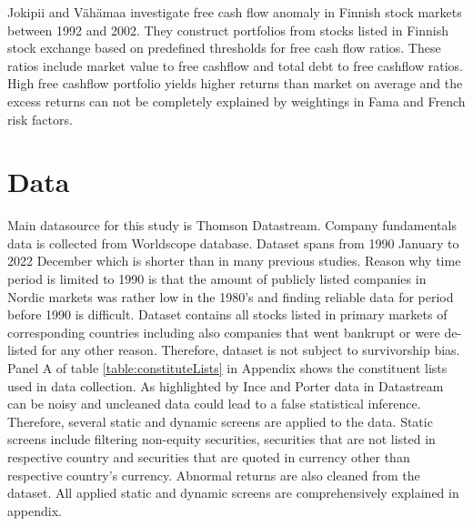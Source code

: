 \documentclass{article}
\begin{document}
Jokipii and Vähämaa \citeyear{jokipii2006free} investigate free cash flow anomaly in Finnish stock markets between 1992 and 2002. They construct portfolios from stocks listed in Finnish stock exchange based on predefined thresholds for free cash flow ratios. These ratios include market value to free cashflow and total debt to free cashflow ratios. High free cashflow portfolio yields higher returns than market on average and the excess returns can not be completely explained by weightings in Fama and French \citeyear{FAMA19933} risk factors.

\section{Data}
Main datasource for this study is Thomson Datastream. Company fundamentals data is collected from Worldscope database. Dataset spans from 1990 January to 2022 December which is shorter than in many previous studies. Reason why time period is limited to 1990 is that the amount of publicly listed companies in Nordic markets was rather low in the 1980's and finding reliable data for period before 1990 is difficult. Dataset contains all stocks listed in primary markets of corresponding countries including also companies that went bankrupt or were de-listed for any other reason. Therefore, dataset is not subject to survivorship bias. Panel A of table \ref{table:constituteLists} in Appendix shows the constituent lists used in data collection. As highlighted by Ince and Porter \citeyear{Ince2006} data in Datastream can be noisy and uncleaned data could lead to a false statistical inference. Therefore, several static and dynamic screens are applied to the data. Static screens include filtering non-equity securities, securities that are not listed in respective country and securities that are quoted in currency other than respective country's currency. Abnormal returns are also cleaned from the dataset.  All applied static and dynamic screens are comprehensively explained in appendix. 
\end{document}
